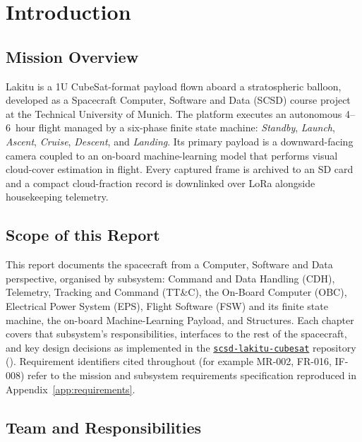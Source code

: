 \chapter{Introduction}

\section{Mission Overview}

Lakitu is a 1U CubeSat-format payload flown aboard a stratospheric balloon,
developed as a Spacecraft Computer, Software and Data (SCSD) course project at
the Technical University of Munich. The platform executes an autonomous
4--6~hour flight managed by a six-phase finite state machine: \emph{Standby},
\emph{Launch}, \emph{Ascent}, \emph{Cruise}, \emph{Descent}, and
\emph{Landing}. Its primary payload is a downward-facing camera coupled to an
on-board machine-learning model that performs visual cloud-cover estimation in
flight. Every captured frame is archived to an SD card and a compact
cloud-fraction record is downlinked over LoRa alongside housekeeping
telemetry.

\section{Scope of this Report}

This report documents the spacecraft from a Computer, Software and Data
perspective, organised by subsystem: Command and Data Handling (CDH),
Telemetry, Tracking and Command (TT\&C), the On-Board Computer (OBC),
Electrical Power System (EPS), Flight Software (FSW) and its finite state
machine, the on-board Machine-Learning Payload, and Structures. Each chapter
covers that subsystem's responsibilities, interfaces to the rest of the
spacecraft, and key design decisions as implemented in the
\href{\repourl}{\texttt{scsd-lakitu-cubesat}} repository
(\href{\repourl}{\repourl}). Requirement identifiers cited throughout
(for example MR-002, FR-016, IF-008) refer to the mission and subsystem
requirements specification reproduced in Appendix~\ref{app:requirements}.

\section{Team and Responsibilities}


